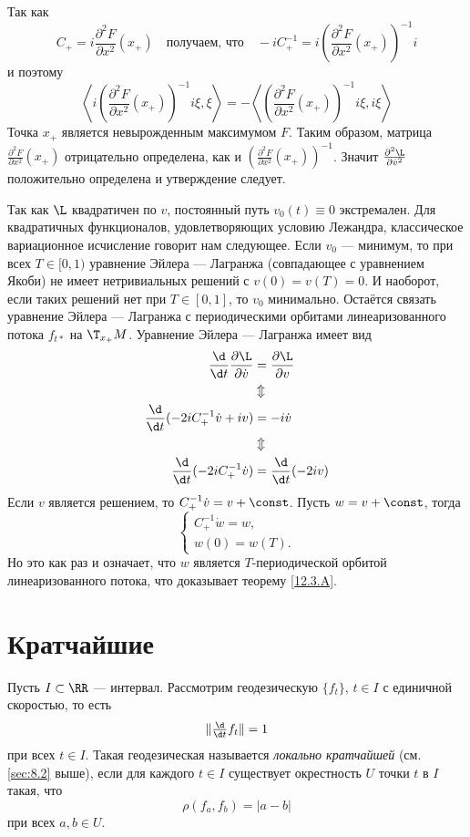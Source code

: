 Так как 
\[C_+=i\frac{\partial^2F}{\partial x^2}(x_+)
\quad\text{получаем, что}\quad
-iC_+^{-1}=i\left(\frac{\partial^2F}{\partial x^2}(x_+)\right)^{-1}i\]
и поэтому 
\[
\left\langle i\left(\frac{\partial^2F}{\partial x^2}(x_+)\right)^{-1}i\xi,\xi\right\rangle
=
-\left\langle \left(\frac{\partial^2F}{\partial x^2}(x_+)\right)^{-1}i\xi,i\xi\right\rangle
\]
Точка $x_+$ является невырожденным максимумом $F$.
Таким образом, матрица $\frac{\partial^2F}{\partial x^2}(x_+)$
отрицательно определена, как и $\left(\frac{\partial^2F}{\partial x^2}(x_+)\right)^{-1}$.
Значит $\tfrac{\partial^2\L}{\partial\dot v^2}$ положительно определена и утверждение следует.

Так как $\L$ квадратичен по $v$, постоянный путь $v_0(t) \equiv 0$ экстремален.
Для квадратичных функционалов, удовлетворяющих условию Лежандра, классическое вариационное исчисление говорит нам следующее.
Если $v_0$ --- минимум, то при всех $T \in [0, 1)$ уравнение Эйлера --- Лагранжа (совпадающее с уравнением Якоби) не имеет нетривиальных решений с $v(0) = v(T) = 0$.
И наоборот, если таких решений нет при $T\in[0, 1]$, то $v_0$ минимально.
Остаётся связать уравнение Эйлера --- Лагранжа с периодическими орбитами линеаризованного потока $f_{t*}$ на $\T_{x_+}M$.
Уравнение Эйлера --- Лагранжа имеет вид
\begin{align*}
\frac{\d}{\d t}\frac{\partial \L}{\partial \dot v}
&=\frac{\partial \L}{\partial v}
\\
&\Updownarrow
\\
\frac{\d}{\d t}(-2iC_+^{-1}\dot v+iv)
&=-i\dot v
\\
&\Updownarrow
\\
\frac{\d}{\d t}(-2iC_+^{-1}\dot v)
&=
\frac{\d}{\d t}(-2iv)
\end{align*}
Если $v$ является решением, то $C_+^{-1}\dot v = v + \const$.
Пусть $w = v + \const$, тогда 
\[
\begin{cases}
C_+^{-1}\dot w=w,
\\
w(0)=w(T).
\end{cases}
\]
Но это как раз и означает, что $w$ является $T$-периодической орбитой линеаризованного потока, что доказывает теорему \ref{12.3.A}.
\qeds


\section{Кратчайшие}
Пусть $I \subset \RR$ --- интервал.
Рассмотрим геодезическую $\{f_t\}$, $t\in I$ с единичной скоростью, то есть
\[\|\tfrac{\d}{\d t}f_t\|=1\]
при всех $t\in I$.
Такая геодезическая называется \emph{локально кратчайшей} (см. \ref{sec:8.2} выше), если для каждого $t\in I$ существует окрестность $U$ точки $t$ в $I$ такая, что 
\[\rho(f_a,f_b)=|a-b|\]
при всех $a,b\in U$.

